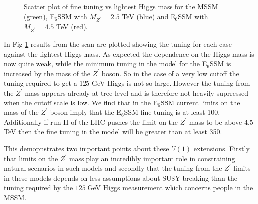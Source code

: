 \documentclass[preprint,amsmath,amssymb,aps,superscriptaddress,prd,showpacs,floatfix,nofootinbib]{revtex4-1}
\begin{document}
\begin{figure}[h]
\begin{center}
\caption{Scatter plot of fine tuning vs lightest Higgs mass for the
  MSSM (green), E$_6$SSM with $M_{Z^\prime} = 2.5$ TeV (blue) and
  E$_6$SSM with $M_{Z^\prime} = 4.5$ TeV (red).}
\label{Fig:e6ssmvsmssm}
\end{center}
\end{figure}
In Fig \ref{Fig:e6ssmvsmssm} results from the scan are plotted showing
the tuning for each case against the lightest Higgs mass.  As expected
the dependence on the Higgs mass is now quite weak, while the minimum
tuning in the model for the E$_6$SSM is increased by the mass of the
$Z^\prime$ boson.  So in the case of a very low cutoff the tuning
required to get a 125 GeV Higgs is not so large.  However the tuning
from the $Z^\prime$ mass appears already at tree level and is
therefore not heavily suprressed when the cutoff scale is low. We find
that in the E$_6$SSM current limits on the mass of the $Z^\prime$
boson imply that the E$_6$SSM fine tuning is at least 100.
Additionally if run II of the LHC pushes the limit on the $Z^\prime$
mass to be above $4.5$ TeV then the fine tuning in the model will be
greater than at least 350.

This demopnstrates two important points about these $U(1)$
extensions. Firstly that limits on the $Z^\prime$ mass play an
incredibly important role in constraining natural scenarios in such
models and secondly that the tuning from the $Z^\prime$ limits in
these models depends on less assumptions about SUSY breaking than the
tuning required by the $125$ GeV Higgs measurement which concerns
people in the MSSM.
\end{document}
